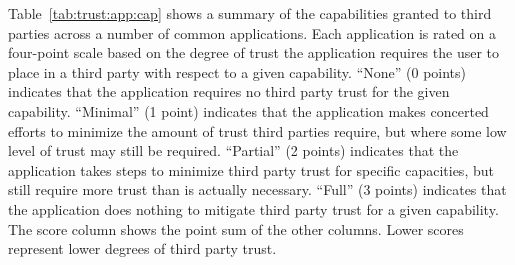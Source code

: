 Table~\ref{tab:trust:app:cap} shows a summary of the capabilities
granted to third parties across a number of common applications. Each
application is rated on a four-point scale based on the degree of
trust the application requires the user to place in a third party with
respect to a given capability. ``None'' (0 points) indicates that the
application requires no third party trust for the given
capability. ``Minimal'' (1 point) indicates that the application makes
concerted efforts to minimize the amount of trust third parties
require, but where some low level of trust may still be
required. ``Partial'' (2 points) indicates that the application takes
steps to minimize third party trust for specific capacities, but still
require more trust than is actually necessary. ``Full'' (3 points)
indicates that the application does nothing to mitigate third party
trust for a given capability. The score column shows the point sum of
the other columns. Lower scores represent lower degrees of third party
trust.

